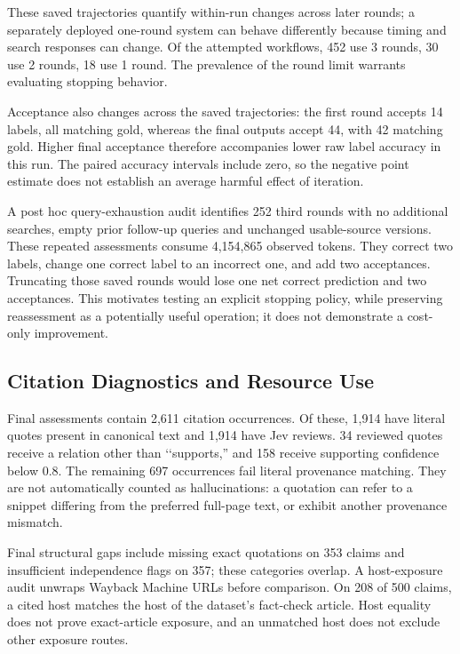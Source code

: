 \documentclass[conference]{IEEEtran}
\begin{document}
These saved trajectories quantify within-run changes across later rounds; a separately deployed one-round system can behave differently because timing and search responses can change. Of the attempted workflows, 452 use 3 rounds, 30 use 2 rounds, 18 use 1 round. The prevalence of the round limit warrants evaluating stopping behavior.

Acceptance also changes across the saved trajectories: the first round accepts 14 labels, all matching gold, whereas the final outputs accept 44, with 42 matching gold. Higher final acceptance therefore accompanies lower raw label accuracy in this run. The paired accuracy intervals include zero, so the negative point estimate does not establish an average harmful effect of iteration.

A post hoc query-exhaustion audit identifies 252 third rounds with no additional searches, empty prior follow-up queries and unchanged usable-source versions. These repeated assessments consume 4,154,865 observed tokens. They correct two labels, change one correct label to an incorrect one, and add two acceptances. Truncating those saved rounds would lose one net correct prediction and two acceptances. This motivates testing an explicit stopping policy, while preserving reassessment as a potentially useful operation; it does not demonstrate a cost-only improvement.

\subsection{Citation Diagnostics and Resource Use}
Final assessments contain 2,611 citation occurrences. Of these, 1,914 have literal quotes present in canonical text and 1,914 have Jev reviews. 34 reviewed quotes receive a relation other than \lq\lq supports,'' and 158 receive supporting confidence below 0.8. The remaining 697 occurrences fail literal provenance matching. They are not automatically counted as hallucinations: a quotation can refer to a snippet differing from the preferred full-page text, or exhibit another provenance mismatch.

Final structural gaps include missing exact quotations on 353 claims and insufficient independence flags on 357; these categories overlap. A host-exposure audit unwraps Wayback Machine URLs before comparison. On 208 of 500 claims, a cited host matches the host of the dataset's fact-check article. Host equality does not prove exact-article exposure, and an unmatched host does not exclude other exposure routes.
\end{document}
